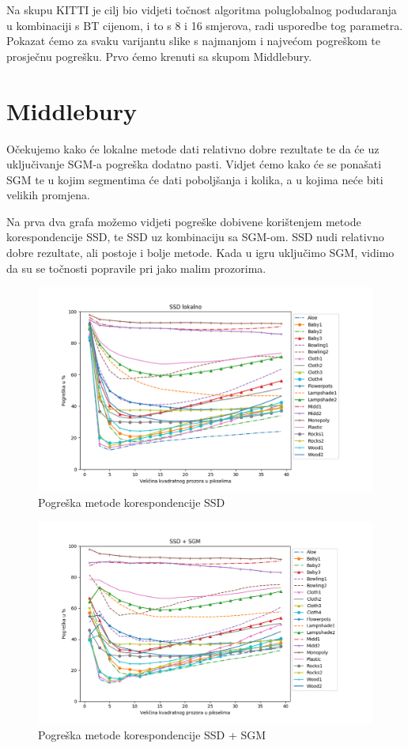 \documentclass[utf8, zavrsni, numeric]{fer}
\begin{document}
Na skupu KITTI je cilj bio vidjeti točnost algoritma poluglobalnog podudaranja u kombinaciji
s BT cijenom, i to s 8 i 16 smjerova, radi usporedbe tog parametra. Pokazat ćemo za svaku
varijantu slike s najmanjom i najvećom pogreškom te prosječnu pogrešku. Prvo ćemo krenuti sa skupom Middlebury.

\section{Middlebury}

Očekujemo kako će lokalne metode dati relativno dobre rezultate te da će uz uključivanje
SGM-a pogreška dodatno pasti. Vidjet ćemo kako će se ponašati SGM te u kojim segmentima će
dati poboljšanja i kolika, a u kojima neće biti velikih promjena.

Na prva dva grafa možemo vidjeti pogreške dobivene korištenjem metode korespondencije SSD, te
SSD uz kombinaciju sa SGM-om. SSD nudi relativno dobre rezultate, ali postoje i bolje
metode. Kada u igru uključimo SGM, vidimo da su se točnosti popravile pri jako malim
prozorima. 

\begin{figure}[H]
  \centering
  \includegraphics[width=13cm]{img/SSD_lokalno_middlebury.png}
  \caption{Pogreška metode korespondencije SSD}
  \label{fig:SSD-error}
\end{figure}

\begin{figure}[H]
  \centering
  \includegraphics[width=13cm]{img/SSD_sgm_middlebury.png}
  \caption{Pogreška metode korespondencije SSD + SGM}
  \label{fig:SSD-sgm-error}
\end{figure}
\end{document}
